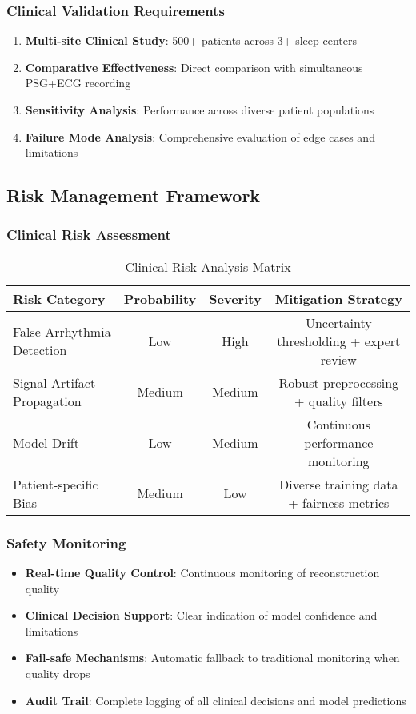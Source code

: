 \documentclass[11pt]{article}
\begin{document}
\subsubsection{Clinical Validation Requirements}
\begin{enumerate}
    \item \textbf{Multi-site Clinical Study}: 500+ patients across 3+ sleep centers
    \item \textbf{Comparative Effectiveness}: Direct comparison with simultaneous PSG+ECG recording
    \item \textbf{Sensitivity Analysis}: Performance across diverse patient populations
    \item \textbf{Failure Mode Analysis}: Comprehensive evaluation of edge cases and limitations
\end{enumerate}

\subsection{Risk Management Framework}

\subsubsection{Clinical Risk Assessment}
\begin{table}[h]
\centering
\caption{Clinical Risk Analysis Matrix}
\label{tab:risk_matrix}
\begin{tabular}{|l|c|c|c|}
\hline
\textbf{Risk Category} & \textbf{Probability} & \textbf{Severity} & \textbf{Mitigation Strategy} \\
\hline
\hline
False Arrhythmia Detection & Low & High & Uncertainty thresholding + expert review \\
\hline
Signal Artifact Propagation & Medium & Medium & Robust preprocessing + quality filters \\
\hline
Model Drift & Low & Medium & Continuous performance monitoring \\
\hline
Patient-specific Bias & Medium & Low & Diverse training data + fairness metrics \\
\hline
\end{tabular}
\end{table}

\subsubsection{Safety Monitoring}
\begin{itemize}
    \item \textbf{Real-time Quality Control}: Continuous monitoring of reconstruction quality
    \item \textbf{Clinical Decision Support}: Clear indication of model confidence and limitations
    \item \textbf{Fail-safe Mechanisms}: Automatic fallback to traditional monitoring when quality drops
    \item \textbf{Audit Trail}: Complete logging of all clinical decisions and model predictions
\end{itemize}
\end{document}
